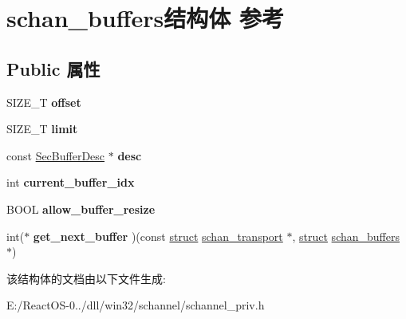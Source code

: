 \hypertarget{structschan__buffers}{}\section{schan\+\_\+buffers结构体 参考}
\label{structschan__buffers}
\subsection*{Public 属性}
\begin{DoxyCompactItemize}
\item 
\mbox{\label{structschan__buffers_a879ef5d8ceddce18c5e443de34085667}} 
S\+I\+Z\+E\+\_\+T {\bfseries offset}
\item 
\mbox{\label{structschan__buffers_a515c19fddd419c051c0f678fecf6e6ec}} 
S\+I\+Z\+E\+\_\+T {\bfseries limit}
\item 
\mbox{\label{structschan__buffers_a80837592e15e0ff278ffc439ddff881d}} 
const \hyperlink{struct___sec_buffer_desc}{Sec\+Buffer\+Desc} $\ast$ {\bfseries desc}
\item 
\mbox{\label{structschan__buffers_a1acdf1a7a041e87c2d5e03aaf2a8a51c}} 
int {\bfseries current\+\_\+buffer\+\_\+idx}
\item 
\mbox{\label{structschan__buffers_a396c474b42e2260a4d72ba35b3d29bad}} 
B\+O\+OL {\bfseries allow\+\_\+buffer\+\_\+resize}
\item 
\mbox{\label{structschan__buffers_a01d4c47d9c9ba9f5405f4f8c5f97cf9f}} 
int($\ast$ {\bfseries get\+\_\+next\+\_\+buffer} )(const \hyperlink{interfacestruct}{struct} \hyperlink{structschan__transport}{schan\+\_\+transport} $\ast$, \hyperlink{interfacestruct}{struct} \hyperlink{structschan__buffers}{schan\+\_\+buffers} $\ast$)
\end{DoxyCompactItemize}


该结构体的文档由以下文件生成\+:\begin{DoxyCompactItemize}
\item 
E\+:/\+React\+O\+S-\/0../dll/win32/schannel/schannel\+\_\+priv.\+h\end{DoxyCompactItemize}
